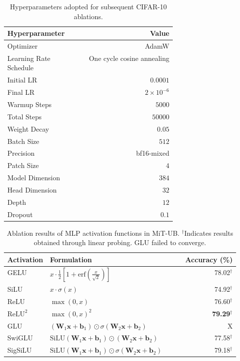 \documentclass[12pt]{article}
\newcommand{\reluTwo}{$\text{ReLU}^2$}
\begin{document}
\begin{table}[H]
    \centering
    \begin{tabular}{p{0.4\linewidth}r}
        \toprule
        Hyperparameter & Value \\
        \midrule
        Optimizer & AdamW \\
        Learning Rate Schedule & One cycle cosine annealing \\
        Initial LR & \(0.0001\) \\
        Final LR & \(2 \times 10^{-6}\) \\
        Warmup Steps & \(5000\) \\
        Total Steps & \(50000\) \\
        Weight Decay & \(0.05\) \\
        \midrule
        Batch Size & \(512\) \\
        Precision & bf16-mixed \\
        \midrule
        Patch Size & \(4\) \\
        Model Dimension & \(384\) \\
        Head Dimension & \(32\) \\
        Depth & \(12\) \\
        Dropout & \(0.1\) \\
        \bottomrule
    \end{tabular}
    \caption{Hyperparameters adopted for subsequent CIFAR-10 ablations.}
    \label{tab:cifar10-hparams}
\end{table}


\begin{table}[H]
    \centering
    \begin{tabular}{p{0.15\linewidth}p{0.4\linewidth}r}
        \toprule
        Activation & Formulation & Accuracy (\%) \\
        \midrule
        GELU & \( x \cdot \frac{1}{2} \left[1 + \mathrm{erf}\left(\frac{x}{\sqrt{2}}\right)\right] \) & 78.02$^{\dagger}$ \\
        SiLU & \( x \cdot \sigma(x) \) & 74.92$^{\dagger}$ \\
        ReLU & \( \max(0, x) \) & 76.60$^{\dagger}$ \\
        \reluTwo & \( \max(0, x)^2 \) & \textbf{79.29}$^{\dagger}$ \\
        \midrule
        GLU & \( (\mathbf{W}_1 \mathbf{x} + \mathbf{b}_1) \odot \sigma(\mathbf{W}_2 \mathbf{x} + \mathbf{b}_2) \) & X \\
        SwiGLU & \( \mathrm{SiLU}(\mathbf{W}_1 \mathbf{x} + \mathbf{b}_1) \odot (\mathbf{W}_2 \mathbf{x} + \mathbf{b}_2) \) & 77.58$^{\dagger}$ \\
        SigSiLU & \( \mathrm{SiLU}(\mathbf{W}_1 \mathbf{x} + \mathbf{b}_1) \odot \sigma(\mathbf{W}_2 \mathbf{x} + \mathbf{b}_2) \) & 79.18$^{\dagger}$ \\
        \bottomrule
    \end{tabular}
    \caption{Ablation results of MLP activation functions in MiT-UB. $^\dagger$Indicates results obtained through linear probing. GLU failed to converge.}
    \label{tab:cifar10-accuracies-activation}
\end{table}
\end{document}
